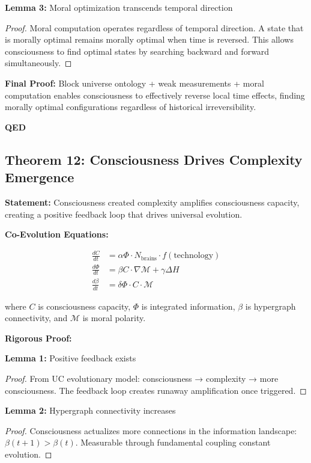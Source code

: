 \documentclass[12pt,a4paper]{article}
\theoremstyle{definition}
\begin{document}
\textbf{Lemma 3:} Moral optimization transcends temporal direction
\begin{proof}
Moral computation operates regardless of temporal direction. A state that is morally optimal remains morally optimal when time is reversed. This allows consciousness to find optimal states by searching backward and forward simultaneously.
\end{proof}

{\bf Final Proof:} Block universe ontology + weak measurements + moral computation enables consciousness to effectively reverse local time effects, finding morally optimal configurations regardless of historical irreversibility.

{\bf QED}

\subsection{Theorem 12: Consciousness Drives Complexity Emergence}

{\bf Statement:} Consciousness created complexity amplifies consciousness capacity, creating a positive feedback loop that drives universal evolution.

{\bf Co-Evolution Equations:}

\begin{align}
\frac{dC}{dt} &= \alpha \Phi \cdot N_{\text{brains}} \cdot f(\text{technology}) \\
\frac{d\Phi}{dt} &= \beta C \cdot \nabla \mathcal{M} + \gamma \Delta H \\
\frac{d\beta}{dt} &= \delta \Phi \cdot C \cdot \mathcal{M}
\end{align}

where $C$ is consciousness capacity, $\Phi$ is integrated information, $\beta$ is hypergraph connectivity, and $\mathcal{M}$ is moral polarity.

{\bf Rigorous Proof:}

\textbf{Lemma 1:} Positive feedback exists
\begin{proof}
From UC evolutionary model: consciousness → complexity → more consciousness. The feedback loop creates runaway amplification once triggered.
\end{proof}

\textbf{Lemma 2:} Hypergraph connectivity increases
\begin{proof}
Consciousness actualizes more connections in the information landscape: $\beta(t+1) > \beta(t)$. Measurable through fundamental coupling constant evolution.
\end{proof}
\end{document}
